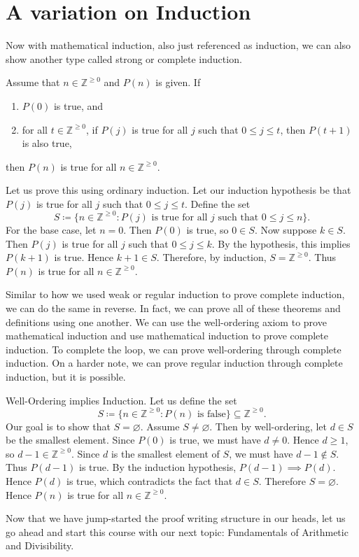 
\section{A variation on Induction}
Now with mathematical induction, also just referenced as induction, we can also show another type called strong or complete induction.
\begin{theorem}{Assume that $n \in \mathbb{Z}^{\geq 0}$ and $P(n)$ is given.
If
    \begin{enumerate}
        \item $P(0)$ is true, and
        \item for all $t \in \mathbb{Z}^{\geq 0}$, if $P(j)$ is true for all $j$ such that $0 \leq j \leq t$, then $P(t+1)$ is also true,
    \end{enumerate}
    then $P(n)$ is true for all $n \in \mathbb{Z}^{\geq 0}$.
}
Let us prove this using ordinary induction.
Let our induction hypothesis be that $P(j)$ is true for all $j$ such that $0 \leq j \leq t$.
Define the set
\[
    S \coloneqq \{n \in \mathbb{Z}^{\geq 0} : P(j) \text{ is true for all } j \text{ such that } 0 \leq j \leq n\}.
\]
For the base case, let $n = 0$.
Then $P(0)$ is true, so $0 \in S$.
Now suppose $k \in S$.
Then $P(j)$ is true for all $j$ such that $0 \leq j \leq k$.
By the hypothesis, this implies $P(k+1)$ is true.
Hence $k+1 \in S$.
Therefore, by induction, $S = \mathbb{Z}^{\geq 0}$.
Thus $P(n)$ is true for all $n \in \mathbb{Z}^{\geq 0}$.
\end{theorem}

Similar to how we used weak or regular induction to prove complete induction, we can do the same in reverse.
In fact, we can prove all of these theorems and definitions using one another.
We can use the well-ordering axiom to prove mathematical induction and use mathematical induction to prove complete induction.
To complete the loop, we can prove well-ordering through complete induction.
On a harder note, we can prove regular induction through complete induction, but it is possible.

\begin{theorem}{Well-Ordering implies Induction.}
Let us define the set
\[
    S \coloneqq \{n \in \mathbb{Z}^{\geq 0} : P(n) \text{ is false}\} \subseteq \mathbb{Z}^{\geq 0}.
\]
Our goal is to show that $S = \varnothing$.
Assume $S \neq \varnothing$.
Then by well-ordering, let $d \in S$ be the smallest element.
Since $P(0)$ is true, we must have $d \neq 0$.
Hence $d \geq 1$, so $d - 1 \in \mathbb{Z}^{\geq 0}$.
Since $d$ is the smallest element of $S$, we must have $d - 1 \notin S$.
Thus $P(d-1)$ is true.
By the induction hypothesis, $P(d-1) \implies P(d)$.
Hence $P(d)$ is true, which contradicts the fact that $d \in S$.
Therefore $S = \varnothing$.
Hence $P(n)$ is true for all $n \in \mathbb{Z}^{\geq 0}$.
\end{theorem}

Now that we have jump-started the proof writing structure in our heads, let us go ahead and start this course with our next topic: Fundamentals of Arithmetic and Divisibility.